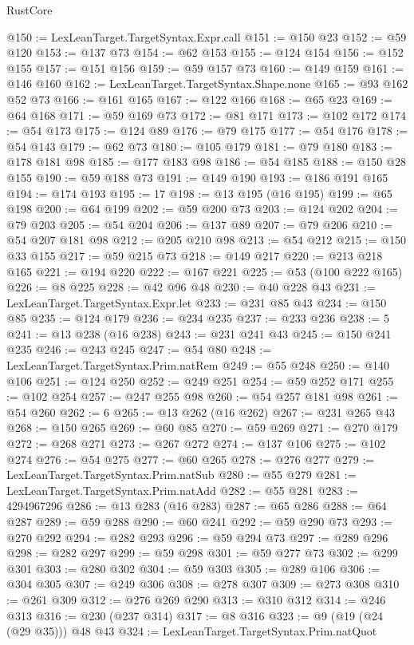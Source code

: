 \begin{lexlean}{RustCore}
\begin{coremodule}
@150 := LexLeanTarget.TargetSyntax.Expr.call
@151 := @150 @23
@152 := @59 @120
@153 := @137 @73
@154 := @62 @153
@155 := @124 @154
@156 := @152 @155
@157 := @151 @156
@159 := @59 @157 @73
@160 := @149 @159
@161 := @146 @160
@162 := LexLeanTarget.TargetSyntax.Shape.none
@165 := @93 @162 @52 @73
@166 := @161 @165
@167 := @122 @166
@168 := @65 @23
@169 := @64 @168
@171 := @59 @169 @73
@172 := @81 @171
@173 := @102 @172
@174 := @54 @173
@175 := @124 @89
@176 := @79 @175
@177 := @54 @176
@178 := @54 @143
@179 := @62 @73
@180 := @105 @179
@181 := @79 @180
@183 := @178 @181 @98
@185 := @177 @183 @98
@186 := @54 @185
@188 := @150 @28 @155
@190 := @59 @188 @73
@191 := @149 @190
@193 := @186 @191 @165
@194 := @174 @193
@195 := 17
@198 := @13 @195 (@16 @195)
@199 := @65 @198
@200 := @64 @199
@202 := @59 @200 @73
@203 := @124 @202
@204 := @79 @203
@205 := @54 @204
@206 := @137 @89
@207 := @79 @206
@210 := @54 @207 @181 @98
@212 := @205 @210 @98
@213 := @54 @212
@215 := @150 @33 @155
@217 := @59 @215 @73
@218 := @149 @217
@220 := @213 @218 @165
@221 := @194 @220
@222 := @167 @221
@225 := @53 (@100 @222 @165)
@226 := @8 @225
@228 := @42 @96 @48
@230 := @40 @228 @43
@231 := LexLeanTarget.TargetSyntax.Expr.let
@233 := @231 @85 @43
@234 := @150 @85
@235 := @124 @179
@236 := @234 @235
@237 := @233 @236
@238 := 5
@241 := @13 @238 (@16 @238)
@243 := @231 @241 @43
@245 := @150 @241 @235
@246 := @243 @245
@247 := @54 @80
@248 := LexLeanTarget.TargetSyntax.Prim.natRem
@249 := @55 @248
@250 := @140 @106
@251 := @124 @250
@252 := @249 @251
@254 := @59 @252 @171
@255 := @102 @254
@257 := @247 @255 @98
@260 := @54 @257 @181 @98
@261 := @54 @260
@262 := 6
@265 := @13 @262 (@16 @262)
@267 := @231 @265 @43
@268 := @150 @265
@269 := @60 @85
@270 := @59 @269
@271 := @270 @179
@272 := @268 @271
@273 := @267 @272
@274 := @137 @106
@275 := @102 @274
@276 := @54 @275
@277 := @60 @265
@278 := @276 @277
@279 := LexLeanTarget.TargetSyntax.Prim.natSub
@280 := @55 @279
@281 := LexLeanTarget.TargetSyntax.Prim.natAdd
@282 := @55 @281
@283 := 4294967296
@286 := @13 @283 (@16 @283)
@287 := @65 @286
@288 := @64 @287
@289 := @59 @288
@290 := @60 @241
@292 := @59 @290 @73
@293 := @270 @292
@294 := @282 @293
@296 := @59 @294 @73
@297 := @289 @296
@298 := @282 @297
@299 := @59 @298
@301 := @59 @277 @73
@302 := @299 @301
@303 := @280 @302
@304 := @59 @303
@305 := @289 @106
@306 := @304 @305
@307 := @249 @306
@308 := @278 @307
@309 := @273 @308
@310 := @261 @309
@312 := @276 @269 @290
@313 := @310 @312
@314 := @246 @313
@316 := @230 (@237 @314)
@317 := @8 @316
@323 := @9 (@19 (@24 (@29 @35))) @48 @43
@324 := LexLeanTarget.TargetSyntax.Prim.natQuot

\end{coremodule}
\end{lexlean}
